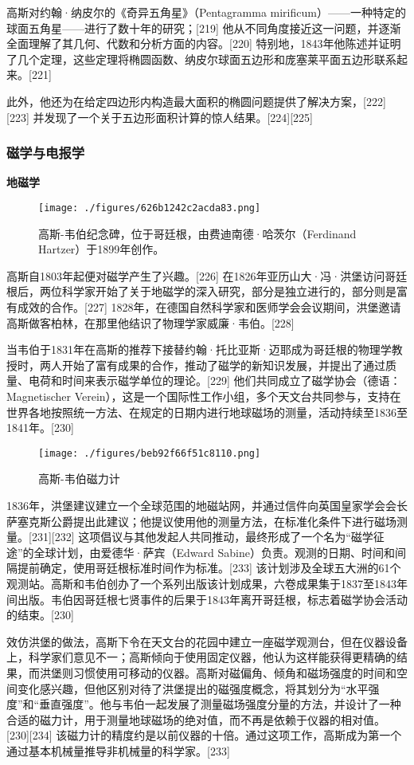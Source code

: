 高斯对约翰·纳皮尔的《奇异五角星》（Pentagramma mirificum）——一种特定的球面五角星——进行了数十年的研究；[219] 他从不同角度接近这一问题，并逐渐全面理解了其几何、代数和分析方面的内容。[220] 特别地，1843年他陈述并证明了几个定理，这些定理将椭圆函数、纳皮尔球面五边形和庞塞莱平面五边形联系起来。[221]

此外，他还为在给定四边形内构造最大面积的椭圆问题提供了解决方案，[222][223] 并发现了一个关于五边形面积计算的惊人结果。[224][225]
\subsubsection{磁学与电报学}  
\textbf{地磁学}
\begin{figure}[ht]
\centering
\texttt{[image: ./figures/626b1242c2acda83.png]}
\caption{高斯-韦伯纪念碑，位于哥廷根，由费迪南德·哈茨尔（Ferdinand Hartzer）于1899年创作。} \label{fig_KRGS_21}
\end{figure}
高斯自1803年起便对磁学产生了兴趣。[226] 在1826年亚历山大·冯·洪堡访问哥廷根后，两位科学家开始了关于地磁学的深入研究，部分是独立进行的，部分则是富有成效的合作。[227] 1828年，在德国自然科学家和医师学会会议期间，洪堡邀请高斯做客柏林，在那里他结识了物理学家威廉·韦伯。[228]

当韦伯于1831年在高斯的推荐下接替约翰·托比亚斯·迈耶成为哥廷根的物理学教授时，两人开始了富有成果的合作，推动了磁学的新知识发展，并提出了通过质量、电荷和时间来表示磁学单位的理论。[229] 他们共同成立了磁学协会（德语：Magnetischer Verein），这是一个国际性工作小组，多个天文台共同参与，支持在世界各地按照统一方法、在规定的日期内进行地球磁场的测量，活动持续至1836至1841年。[230]
\begin{figure}[ht]
\centering
\texttt{[image: ./figures/beb92f66f51c8110.png]}
\caption{高斯-韦伯磁力计} \label{fig_KRGS_22}
\end{figure}
1836年，洪堡建议建立一个全球范围的地磁站网，并通过信件向英国皇家学会会长萨塞克斯公爵提出此建议；他提议使用他的测量方法，在标准化条件下进行磁场测量。[231][232] 这项倡议与其他发起人共同推动，最终形成了一个名为“磁学征途”的全球计划，由爱德华·萨宾（Edward Sabine）负责。观测的日期、时间和间隔提前确定，使用哥廷根标准时间作为标准。[233] 该计划涉及全球五大洲的61个观测站。高斯和韦伯创办了一个系列出版该计划成果，六卷成果集于1837至1843年间出版。韦伯因哥廷根七贤事件的后果于1843年离开哥廷根，标志着磁学协会活动的结束。[230]

效仿洪堡的做法，高斯下令在天文台的花园中建立一座磁学观测台，但在仪器设备上，科学家们意见不一；高斯倾向于使用固定仪器，他认为这样能获得更精确的结果，而洪堡则习惯使用可移动的仪器。高斯对磁偏角、倾角和磁场强度的时间和空间变化感兴趣，但他区别对待了洪堡提出的磁强度概念，将其划分为“水平强度”和“垂直强度”。他与韦伯一起发展了测量磁场强度分量的方法，并设计了一种合适的磁力计，用于测量地球磁场的绝对值，而不再是依赖于仪器的相对值。[230][234] 该磁力计的精度约是以前仪器的十倍。通过这项工作，高斯成为第一个通过基本机械量推导非机械量的科学家。[233]

